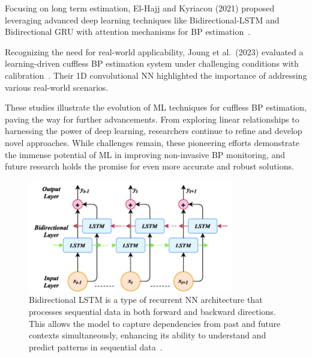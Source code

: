 Focusing on long term estimation, El-Hajj and Kyriacou (2021) proposed leveraging advanced deep learning techniques like Bidirectional-LSTM and Bidirectional \ac{GRU} with attention mechanisms for BP estimation~\cite{el-hajjDeepLearningModels2021}.

Recognizing the need for real-world applicability, Joung et al.\ (2023) evaluated a learning-driven cuffless BP estimation system under challenging conditions with calibration~\cite{joungContinuousCufflessBlood2023}.
Their 1D convolutional NN highlighted the importance of addressing various real-world scenarios.

These studies illustrate the evolution of ML techniques for cuffless BP estimation, paving the way for further advancements.
From exploring linear relationships to harnessing the power of deep learning, researchers continue to refine and develop novel approaches.
While challenges remain, these pioneering efforts demonstrate the immense potential of ML in improving non-invasive BP monitoring, and future research holds the promise for even more accurate and robust solutions.

\begin{figure}[h]
    \centering
    \includegraphics[width=0.8\textwidth]{images/ml/lstm}
    \captionsetup{format=plain, justification=raggedright}
    \caption{\small Bidirectional LSTM is a type of recurrent NN architecture that processes sequential data in both forward and backward directions. This allows the model to capture dependencies from past and future contexts simultaneously, enhancing its ability to understand and predict patterns in sequential data~\cite{anishnamaUnderstandingBidirectionalLSTM2023}.}
    \label{fig:lstm}
\end{figure}

\vspace{0.2cm}

